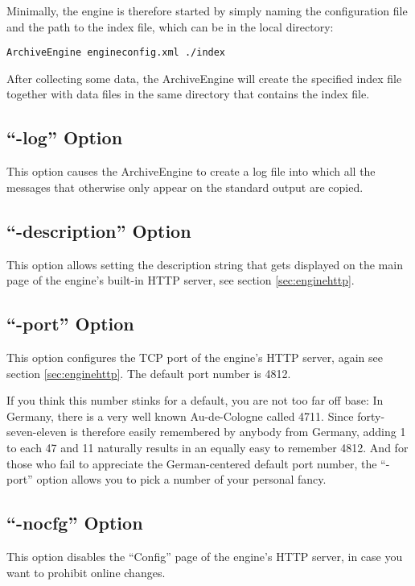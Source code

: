 \noindent Minimally, the engine is therefore started by simply naming the
configuration file and the path to the index file, which can be in the
local directory:

\begin{lstlisting}[frame=none,keywordstyle=\sffamily]
ArchiveEngine engineconfig.xml ./index
\end{lstlisting}

\noindent After collecting some data, the ArchiveEngine will create the
specified index file together with data files in the same directory
that contains the index file.

\subsection{``-log'' Option}
This option causes the ArchiveEngine to create a log file into which
all the messages that otherwise only appear on the standard output are copied.

\subsection{``-description'' Option}
This option allows setting the description string that gets displayed
on the main page of the engine's built-in HTTP server, see
section \ref{sec:enginehttp}.

\subsection{``-port'' Option}
This option configures the TCP port of the engine's HTTP server, again
see section \ref{sec:enginehttp}. The default port number is 4812.

If you think this number stinks for a default, you are not too far off
base: In Germany, there is a very well known Au-de-Cologne called
4711.  Since forty-seven-eleven is therefore easily remembered by
anybody from Germany, adding 1 to each 47 and 11 naturally results in
an equally easy to remember 4812.
And for those who fail to appreciate the German-centered default port
number, the ``-port'' option allows you to pick a number of your
personal fancy.

\subsection{``-nocfg'' Option}
This option disables the ``Config'' page of the engine's HTTP server,
in case you want to prohibit online changes.

